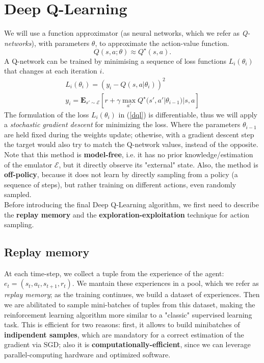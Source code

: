 \documentclass{article}
\begin{document}
\section{Deep Q-Learning}

We will use a function approximator (as neural networks, which we refer as \textit{Q-networks}), with parameters $\theta$, to approximate the action-value function.
\begin{equation}
	Q(s, a; \theta) \approx Q ^\star (s, a). 
\end{equation}
A Q-network can be trained by minimising a sequence of loss functions $L_i(\theta _i )$ that changes at each
iteration $i$.
\begin{equation}
\label{dql}
\begin{aligned}
	L_i(\theta _i ) = (y_i - Q(s,a|\theta_i))^2 \\
	y_i = \mathbf{E}_{s' \sim \mathcal{E}} [ r + \gamma \max_{a'} Q^\star(s', a'|\theta_{i-1}) | s, a  ]
\end{aligned}
\end{equation}
The formulation of the loss $L_i(\theta_i)$ in (\ref{dql}) is differentiable, thus we will apply a \textit{stochastic gradient descent} for minimizing the loss.
Where the parameters $\theta_{i-1}$ are held fixed during the weights update; othewise, with a gradient descent step the target would also try to match the Q-network values, instead of the opposite. Note that this method is \textbf{model-free}, i.e. it has no prior knowledge/estimation of the emulator $\mathcal{E}$, but it directly observe its "external" state. Also, the method is \textbf{off-policy}, because it does not learn by directly sampling from a policy (a sequence of steps), but rather training on different actions, even randomly sampled.\\
Before introducing the final Deep Q-Learning algorithm, we first need to describe the \textbf{replay memory} and the \textbf{exploration-exploitation} technique for action sampling.
\subsection{Replay memory}
At each time-step, we collect a tuple from the experience of the agent: $e_t = (s_t, a_t, s_{t+1}, r_t)$. We mantain these experiences in a pool, which we refer as \textit{replay memory}; as the training continues, we build a dataset of experiences. Then we are abilitated to sample mini-batches of tuples from this dataset, making the reinforcement learning algorithm more similar to a "classic" supervised learning task. This is efficient for two reasons: first, it allows to build minibatches of \textbf{indipendent samples}, which are mandatory for a correct estimation of the gradient via SGD; also it is \textbf{computationally-efficient}, since we can leverage parallel-computing hardware and optimized software.
\end{document}
